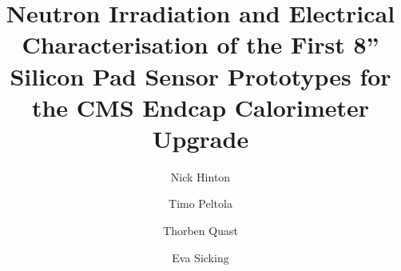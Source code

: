 \documentclass[a4paper,11pt]{article}
\title{\boldmath Neutron Irradiation and Electrical Characterisation of the First 8'' Silicon Pad Sensor Prototypes for the CMS Endcap Calorimeter Upgrade}
\author[a]{Nick Hinton}
\author[b]{Timo Peltola}
\author[c]{Thorben Quast}
\author[c]{Eva Sicking}
\affiliation[a]{Brown University}
\affiliation[b]{Texas Tech University}
\affiliation[c]{CERN Experimental Physics Department}
\begin{document}
\maketitle
\flushbottom

\linenumbers








\appendix





\end{document}
